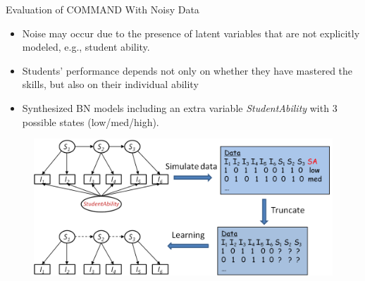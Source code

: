 \documentclass[hyperref={pdfpagelabels=false}]{beamer}
\begin{document}
\begin{frame}{Evaluation of COMMAND With Noisy Data}
	\begin{itemize}\small
		\item Noise may occur due to the presence of latent variables that are not explicitly modeled, e.g., student ability.
		\item Students' performance depends not only on whether they have mastered the skills, but also on their individual ability
		\item Synthesized BN models including an extra variable \emph{StudentAbility} with 3 possible states (low/med/high). 
	\end{itemize}
	\begin{figure}[h]
		\begin{center}
			\includegraphics[scale = .45]{figures/studentability.png}
		\end{center}
	\end{figure}	
\end{frame}
\end{document}
